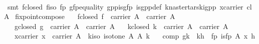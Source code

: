 \begin{isabellebody}
%
\isadelimproof
\ \ %
\endisadelimproof
%
\isatagproof
{}\isamarkupfalse%
\ {}smt\ f{}closed\ f{}iso\ fp\ gfp{}equality\ gpp{}is{}gfp\ is{}gpp{}def\ knaster{}tarski{}gpp\ x{}carrier\ cl{}A{}%
\endisatagproof
{\isafoldproof}%
%
\isadelimproof
%
\endisadelimproof
%
\isamarkuptrue%
\isamarkupfalse%
\ fixpoint{}compose{}\isanewline
\ \ \ f{}closed{}\ {}f\ {}\ carrier\ A\ {}\ carrier\ A{}\isanewline
\ \ \ g{}closed{}\ {}g\ {}\ carrier\ A\ {}\ carrier\ A{}\isanewline
\ \ \ k{}closed{}\ {}k\ {}\ carrier\ A\ {}\ carrier\ A{}\isanewline
\ \ \ x{}carrier{}\ {}x\ {}\ carrier\ A{}\ \ k{}iso{}\ {}isotone\ A\ A\ k{}\isanewline
\ \ \ comp{}\ {}g{}k\ {}\ k{}h{}\ \ fp{}\ {}is{}fp\ A\ x\ h{}\isanewline

\end{isabellebody}
